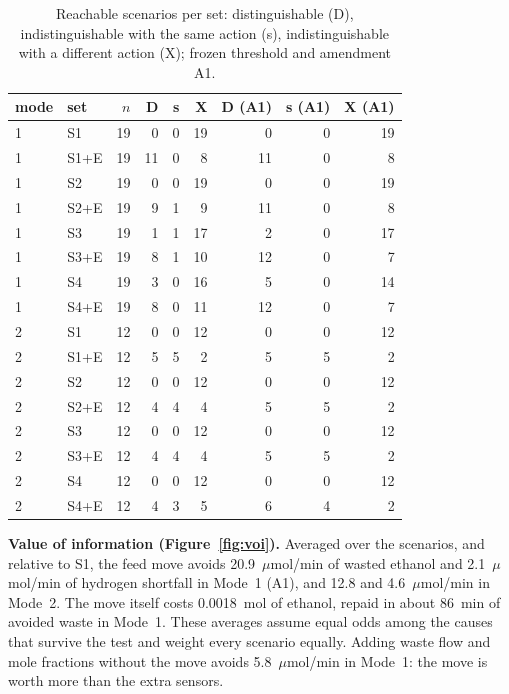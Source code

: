 \documentclass[10pt,a4paper]{article}
\begin{document}
\begin{table}[h]\centering\small
\caption{Reachable scenarios per set: distinguishable (D), indistinguishable with the same action (s), indistinguishable with a different action (X); frozen threshold and amendment A1.}\label{tab:map}
\begin{tabular}{llrrrrrrr}\toprule
mode & set & $n$ & D & s & X & D (A1) & s (A1) & X (A1) \\\midrule
1 & S1 & 19 & 0 & 0 & 19 & 0 & 0 & 19 \\
1 & S1+E & 19 & 11 & 0 & 8 & 11 & 0 & 8 \\
1 & S2 & 19 & 0 & 0 & 19 & 0 & 0 & 19 \\
1 & S2+E & 19 & 9 & 1 & 9 & 11 & 0 & 8 \\
1 & S3 & 19 & 1 & 1 & 17 & 2 & 0 & 17 \\
1 & S3+E & 19 & 8 & 1 & 10 & 12 & 0 & 7 \\
1 & S4 & 19 & 3 & 0 & 16 & 5 & 0 & 14 \\
1 & S4+E & 19 & 8 & 0 & 11 & 12 & 0 & 7 \\
2 & S1 & 12 & 0 & 0 & 12 & 0 & 0 & 12 \\
2 & S1+E & 12 & 5 & 5 & 2 & 5 & 5 & 2 \\
2 & S2 & 12 & 0 & 0 & 12 & 0 & 0 & 12 \\
2 & S2+E & 12 & 4 & 4 & 4 & 5 & 5 & 2 \\
2 & S3 & 12 & 0 & 0 & 12 & 0 & 0 & 12 \\
2 & S3+E & 12 & 4 & 4 & 4 & 5 & 5 & 2 \\
2 & S4 & 12 & 0 & 0 & 12 & 0 & 0 & 12 \\
2 & S4+E & 12 & 4 & 3 & 5 & 6 & 4 & 2 \\
\bottomrule\end{tabular}\end{table}

\textbf{Value of information (Figure~\ref{fig:voi}).} Averaged over the scenarios, and relative to S1, the feed move avoids 20.9~$\mu$mol/min of wasted ethanol and 2.1~$\mu$mol/min of hydrogen shortfall in Mode~1 (A1), and 12.8 and 4.6~$\mu$mol/min in Mode~2. The move itself costs 0.0018~mol of ethanol, repaid in about 86~min of avoided waste in Mode~1. These averages assume equal odds among the causes that survive the test and weight every scenario equally. Adding waste flow and mole fractions without the move avoids 5.8~$\mu$mol/min in Mode~1: the move is worth more than the extra sensors.
\end{document}
